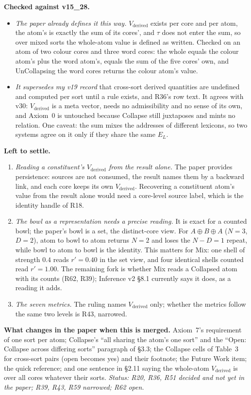 \documentclass[11pt]{article}
\begin{document}
\textbf{Checked against v15\_28.}
\begin{itemize}
\item \emph{The paper already defines it this way.} $V_{\text{derived}}$ exists
per core and per atom, the atom's is exactly the sum of its cores', and $\tau$
does not enter the sum, so over mixed sorts the whole-atom value is defined as
written. Checked on an atom of two colour cores and three word cores: the
whole equals the colour atom's plus the word atom's, equals the sum of the
five cores' own, and UnCollapsing the word cores returns the colour atom's
value.
\item \emph{It supersedes my v19 record} that cross-sort derived quantities are
undefined and computed per sort until a rule exists, and R36's row text. It
agrees with v30: $V_{\text{derived}}$ is a meta vector, needs no admissibility
and no sense of its own, and Axiom~0 is untouched because Collapse still
juxtaposes and mints no relation. One caveat: the sum mixes the addresses of
different lexicons, so two systems agree on it only if they share the same $E_L$.
\end{itemize}

\textbf{Left to settle.}
\begin{enumerate}
\item \emph{Reading a constituent's $V_{\text{derived}}$ from the result alone.}
The paper provides persistence: sources are not consumed, the result names them
by a backward link, and each core keeps its own $V_{\text{derived}}$. Recovering a
constituent atom's value from the result alone would need a core-level source
label, which is the identity handle of R18.
\item \emph{The bowl as a representation needs a precise reading.} It is exact
for a counted bowl; the paper's bowl is a set, the distinct-core view.
For $A\oplus B\oplus A$ ($N=3$, $D=2$), atom to bowl to atom returns $N=2$ and
loses the $N-D=1$ repeat, while bowl to atom to bowl is the identity. This
matters for Mix: one shell of strength $0.4$ reads $r'=0.40$ in the set view,
and four identical shells counted read $r'=1.00$. The remaining fork is
whether Mix reads a Collapsed atom with its counts (R62, R39); Inference v2
\S8.1 currently says it does, as a reading it adds.
\item \emph{The seven metrics.} The ruling names $V_{\text{derived}}$ only; whether
the metrics follow the same two levels is R43, narrowed.
\end{enumerate}

\textbf{What changes in the paper when this is merged.} Axiom~7's requirement of
one sort per atom; Collapse's ``all sharing the atom's one sort'' and the
``Open: Collapse across differing sorts'' paragraph of \S3.3; the Collapse cells of
Table~3 for cross-sort pairs (open becomes yes) and their footnote; the
Future Work item; the quick reference; and one sentence in \S2.11 saying the
whole-atom $V_{\text{derived}}$ is over all cores whatever their sorts.
\emph{Status: R20, R36, R51 decided and not yet in the paper; R39, R43, R59
narrowed; R62 open.}
\end{document}
